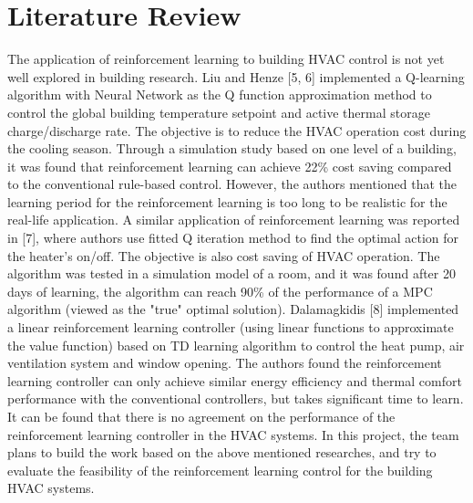 \documentclass{article}
\begin{document}
\section{Literature Review}
The application of reinforcement learning to building HVAC control is not yet well explored in building research. Liu and Henze [5, 6] implemented a Q-learning algorithm with Neural Network as the Q function approximation method to control the global building temperature setpoint and active thermal storage charge/discharge rate. The objective is to reduce the HVAC operation cost during the cooling season. Through a simulation study based on one level of a building, it was found that reinforcement learning can achieve 22\% cost saving compared to the conventional rule-based control. However, the authors mentioned that the learning period for the reinforcement learning is too long to be realistic for the real-life application. A similar application of reinforcement learning was reported in [7], where authors use fitted Q iteration method to find the optimal action for the heater's on/off. The objective is also cost saving of HVAC operation. The algorithm was tested in a simulation model of a room, and it was found after 20 days of learning, the algorithm can reach 90\% of the performance of a MPC algorithm (viewed as the "true" optimal solution). Dalamagkidis [8] implemented a linear reinforcement learning controller (using linear functions to approximate the value function) based on TD learning algorithm to control the heat pump, air ventilation system and window opening. The authors found the reinforcement learning controller can only achieve similar energy efficiency and thermal comfort performance with the conventional controllers, but takes significant time to learn. It can be found that there is no agreement on the performance of the reinforcement learning controller in the HVAC systems. In this project, the team plans to build the work based on the above mentioned researches, and try to evaluate the feasibility of the reinforcement learning control for the building HVAC systems. 
\end{document}
